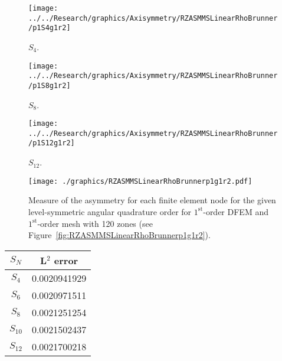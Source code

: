 \documentclass[12pt]{article}
\begin{document}
\begin{sidewaysfigure}[!htb]
\centering
\begin{subfigure}{0.33\textwidth}
\texttt{[image: ../../Research/graphics/Axisymmetry/RZASMMSLinearRhoBrunner/p1S4g1r2]}
\caption{$S_4$.}
\end{subfigure}%
\begin{subfigure}{0.33\textwidth}
\texttt{[image: ../../Research/graphics/Axisymmetry/RZASMMSLinearRhoBrunner/p1S8g1r2]}
\caption{$S_8$.}
\end{subfigure}%
\begin{subfigure}{0.33\textwidth}
\texttt{[image: ../../Research/graphics/Axisymmetry/RZASMMSLinearRhoBrunner/p1S12g1r2]}
\caption{$S_{12}$.}
\end{subfigure}
\caption{Relative asymmetry for $1^\text{st}$-order finite elements on a $1^\text{st}$-order mesh for given order of level-symmetric angular quadrature.}
\label{fig:RZASMMSLinearRhoBrunnerp1g1r2}
\end{sidewaysfigure}

\begin{figure}[!htb]
\centering
\texttt{[image: ./graphics/RZASMMSLinearRhoBrunnerp1g1r2.pdf]}
\caption{Measure of the asymmetry for each finite element node for the given level-symmetric angular quadrature order for $1^\text{st}$-order DFEM and $1^\text{st}$-order mesh with 120 zones (see Figure~\ref{fig:RZASMMSLinearRhoBrunnerp1g1r2}).}
\label{fig:RZASMMSLinearRhoBrunnerp1g1r2Nodes}
\end{figure}

\begin{table}[!htb]
\centering
{\renewcommand{\arraystretch}{1.5}
\begin{tabular}{|c|c|}
\hline
$S_N$ & L$^2$ error \\\hline
$S_4$ & 0.0020941929 \\\hline
$S_6$ & 0.0020971511 \\\hline
$S_8$ & 0.0021251254 \\\hline
$S_{10}$ & 0.0021502437 \\\hline
$S_{12}$ & 0.0021700218 \\\hline
\end{tabular}}
\end{table}
\end{document}
